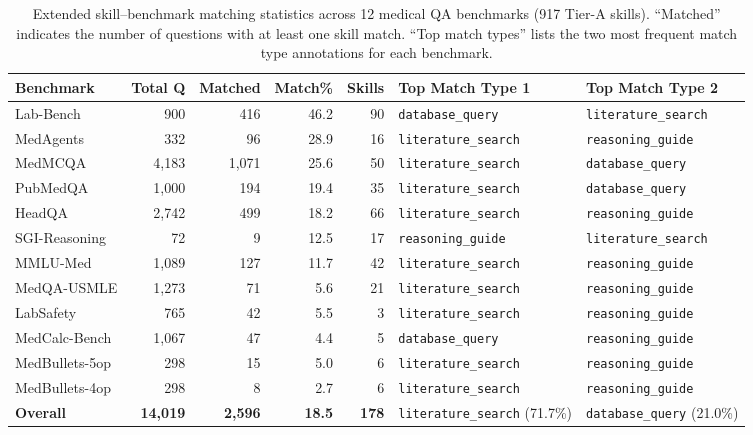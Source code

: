 \begin{table}[t]
\centering\small
\caption{Extended skill--benchmark matching statistics across 12 medical QA benchmarks (917 Tier-A skills).
``Matched'' indicates the number of questions with at least one skill match.
``Top match types'' lists the two most frequent match type annotations for each benchmark.}
\begin{tabular}{lrrrrll}
\toprule
\textbf{Benchmark} & \textbf{Total Q} & \textbf{Matched} & \textbf{Match\%} & \textbf{Skills} & \textbf{Top Match Type 1} & \textbf{Top Match Type 2} \\
\midrule
Lab-Bench         &   900 & 416 & 46.2 & 90 & \texttt{database\_query}    & \texttt{literature\_search} \\
MedAgents         &   332 &  96 & 28.9 & 16 & \texttt{literature\_search}  & \texttt{reasoning\_guide}   \\
MedMCQA           & 4,183 &1,071& 25.6 & 50 & \texttt{literature\_search}  & \texttt{database\_query}    \\
PubMedQA          & 1,000 & 194 & 19.4 & 35 & \texttt{literature\_search}  & \texttt{database\_query}    \\
HeadQA            & 2,742 & 499 & 18.2 & 66 & \texttt{literature\_search}  & \texttt{reasoning\_guide}   \\
SGI-Reasoning     &    72 &   9 & 12.5 & 17 & \texttt{reasoning\_guide}    & \texttt{literature\_search} \\
MMLU-Med          & 1,089 & 127 & 11.7 & 42 & \texttt{literature\_search}  & \texttt{reasoning\_guide}   \\
MedQA-USMLE       & 1,273 &  71 &  5.6 & 21 & \texttt{literature\_search}  & \texttt{reasoning\_guide}   \\
LabSafety         &   765 &  42 &  5.5 &  3 & \texttt{literature\_search}  & \texttt{reasoning\_guide}   \\
MedCalc-Bench     & 1,067 &  47 &  4.4 &  5 & \texttt{database\_query}     & \texttt{reasoning\_guide}   \\
MedBullets-5op    &   298 &  15 &  5.0 &  6 & \texttt{literature\_search}  & \texttt{reasoning\_guide}   \\
MedBullets-4op    &   298 &   8 &  2.7 &  6 & \texttt{literature\_search}  & \texttt{reasoning\_guide}   \\
\midrule
\textbf{Overall}  & \textbf{14,019} & \textbf{2,596} & \textbf{18.5} & \textbf{178} & \texttt{literature\_search} (71.7\%) & \texttt{database\_query} (21.0\%) \\
\bottomrule
\end{tabular}
\label{tab:full_benchmark}
\end{table}

